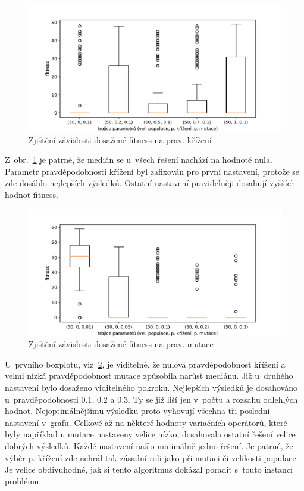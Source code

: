\begin{figure}[!h]
    \centering
    \includegraphics[scale=0.75]{obrazky-figures/exp-lgp-santafe-searching-params-2.pdf}
    \caption{Zjištění závislosti dosažené fitness na prav. křížení}
    \label{fig:exp-lgp-santafe-searching-params-2}
\end{figure}

Z~obr.~\ref{fig:exp-lgp-santafe-searching-params-2} je patrné, že medián se u~všech řešení nachází na hodnotě nula. Parametr pravděpodobnosti křížení byl zafixován pro první nastavení, protože se zde dosáhlo nejlepších výsledků. Ostatní nastavení pravidelněji dosahují vyšších hodnot fitness.

\begin{figure}[!h]
    \centering
    \includegraphics[scale=0.75]{obrazky-figures/exp-lgp-santafe-searching-params-3.pdf}
    \caption{Zjištění závislosti dosažené fitness na prav. mutace}
    \label{fig:exp-lgp-santafe-searching-params-3}
\end{figure}

U~prvního boxplotu, viz~\ref{fig:exp-lgp-santafe-searching-params-3}, je viditelné, že nulová pravděpodobnost křížení a velmi nízká pravděpodobnost mutace způsobila narůst mediánu. Již u~druhého nastavení bylo dosaženo viditelného pokroku. Nejlepších výsledků je dosahováno u~pravděpodobnosti 0.1, 0.2 a 0.3. Ty se již liší jen v~počtu a rozsahu odlehlých hodnot. Nejoptimálnějšímu výsledku proto vyhovují všechna tři poslední nastavení v~grafu. Celkově až na některé hodnoty variačních operátorů, které byly například u mutace nastaveny velice nízko, dosahovala ostatní řešení velice dobrých výsledků. Každé nastavení našlo minimálně jedno řešení. Je patrné, že výběr p. křížení zde nehrál tak zásadní roli jako při mutaci či velikosti populace. Je velice obdivuhodné, jak si tento algoritmus dokázal poradit s~touto instancí problému.

